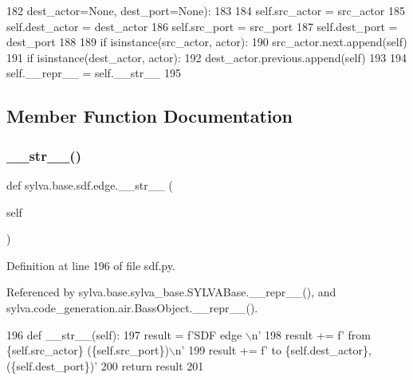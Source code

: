 \begin{DoxyCode}
182                      dest\_actor=\textcolor{keywordtype}{None}, dest\_port=\textcolor{keywordtype}{None}):
183 
184             self.src\_actor = src\_actor
185             self.dest\_actor = dest\_actor
186             self.src\_port = src\_port
187             self.dest\_port = dest\_port
188 
189             \textcolor{keywordflow}{if} isinstance(src\_actor, actor):
190                 src\_actor.next.append(self)
191             \textcolor{keywordflow}{if} isinstance(dest\_actor, actor):
192                 dest\_actor.previous.append(self)
193 
194             self.\_\_repr\_\_ = self.\_\_str\_\_
195 
\end{DoxyCode}


\subsection{Member Function Documentation}
\mbox{\label{classsylva_1_1base_1_1sdf_1_1edge_aec8cfee02481374bcbd68fb91d0afb1a}} 
\subsubsection{\texorpdfstring{\+\_\+\+\_\+str\+\_\+\+\_\+()}{\_\_str\_\_()}}
{\footnotesize\ttfamily def sylva.\+base.\+sdf.\+edge.\+\_\+\+\_\+str\+\_\+\+\_\+ (\begin{DoxyParamCaption}\item[{}]{self }\end{DoxyParamCaption})}



Definition at line 196 of file sdf.\+py.



Referenced by sylva.\+base.\+sylva\+\_\+base.\+S\+Y\+L\+V\+A\+Base.\+\_\+\+\_\+repr\+\_\+\+\_\+(), and sylva.\+code\+\_\+generation.\+air.\+Bass\+Object.\+\_\+\+\_\+repr\+\_\+\+\_\+().


\begin{DoxyCode}
196         \textcolor{keyword}{def }\_\_str\_\_(self):
197             result = f\textcolor{stringliteral}{'SDF edge \(\backslash\)n'}
198             result += f\textcolor{stringliteral}{'  from \{self.src\_actor\} (\{self.src\_port\})\(\backslash\)n'}
199             result += f\textcolor{stringliteral}{'  to \{self.dest\_actor\}, (\{self.dest\_port\})'}
200             \textcolor{keywordflow}{return} result
201 
\end{DoxyCode}
\mbox{\label{classsylva_1_1base_1_1sdf_1_1edge_a1b17c24443ba7f3dc4b81c4a73ebe699}} 
